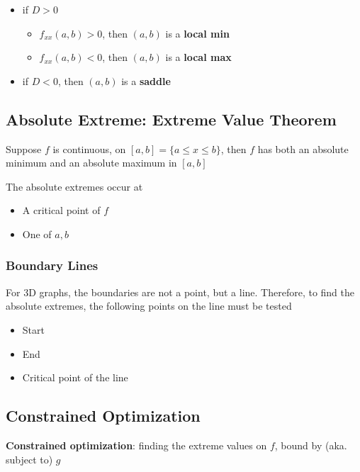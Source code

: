     \begin{itemize}
      \item if $ D > 0 $
      \begin{itemize}
        \item $ f_{xx} (a, b) > 0 $, then $ (a, b) $ is a \textbf{local min}
        \item $ f_{xx} (a, b) < 0 $, then $ (a, b) $ is a \textbf{local max}
      \end{itemize}

      \item if $ D < 0 $, then $ (a, b) $ is a \textbf{saddle}
    \end{itemize}

  \subsection{Absolute Extreme: Extreme Value Theorem}

    Suppose $ f $ is continuous, on $ \left[ a, b \right] = \{ a \le x \le b \} $,
    then $ f $ has both an absolute minimum and an absolute maximum in
    $ \left[ a, b \right] $

    The absolute extremes occur at
    \begin{itemize}
      \item A critical point of $ f $
      \item One of $ a, b $
    \end{itemize}

    \subsubsection{Boundary Lines}

      For 3D graphs, the boundaries are not a point, but a line. Therefore,
      to find the absolute extremes, the following points on the line must be
      tested
      \begin{itemize}
        \item Start
        \item End
        \item Critical point of the line
      \end{itemize}

  \subsection{Constrained Optimization}

    \textbf{Constrained optimization}: finding the extreme values on $ f $,
    bound by (aka. subject to) $ g $


